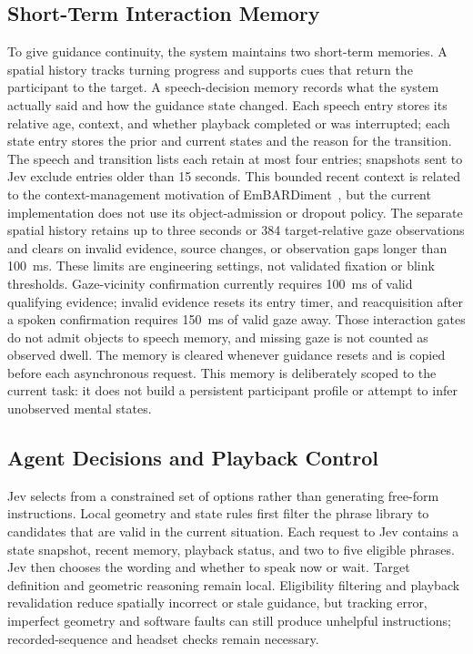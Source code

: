\documentclass[11pt,letterpaper]{article}
\begin{document}
\subsection{Short-Term Interaction Memory}
To give guidance continuity, the system maintains two short-term memories. A spatial history tracks turning progress and supports cues that return the participant to the target. A speech-decision memory records what the system actually said and how the guidance state changed. Each speech entry stores its relative age, context, and whether playback completed or was interrupted; each state entry stores the prior and current states and the reason for the transition. The speech and transition lists each retain at most four entries; snapshots sent to Jev exclude entries older than 15 seconds. This bounded recent context is related to the context-management motivation of EmBARDiment~\cite{bovo2025embardiment}, but the current implementation does not use its object-admission or dropout policy. The separate spatial history retains up to three seconds or 384 target-relative gaze observations and clears on invalid evidence, source changes, or observation gaps longer than 100~ms. These limits are engineering settings, not validated fixation or blink thresholds. Gaze-vicinity confirmation currently requires 100~ms of valid qualifying evidence; invalid evidence resets its entry timer, and reacquisition after a spoken confirmation requires 150~ms of valid gaze away. Those interaction gates do not admit objects to speech memory, and missing gaze is not counted as observed dwell. The memory is cleared whenever guidance resets and is copied before each asynchronous request. This memory is deliberately scoped to the current task: it does not build a persistent participant profile or attempt to infer unobserved mental states.

\subsection{Agent Decisions and Playback Control}
Jev selects from a constrained set of options rather than generating free-form instructions. Local geometry and state rules first filter the phrase library to candidates that are valid in the current situation. Each request to Jev contains a state snapshot, recent memory, playback status, and two to five eligible phrases. Jev then chooses the wording and whether to speak now or wait. Target definition and geometric reasoning remain local. Eligibility filtering and playback revalidation reduce spatially incorrect or stale guidance, but tracking error, imperfect geometry and software faults can still produce unhelpful instructions; recorded-sequence and headset checks remain necessary.
\end{document}
